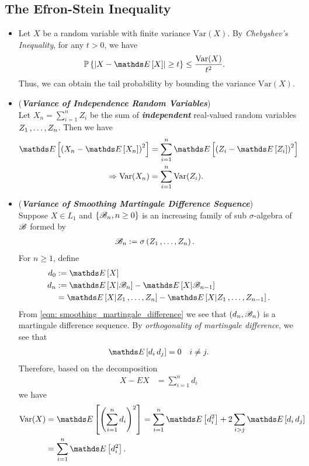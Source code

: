 \documentclass[11pt]{article}
\begin{document}
\subsection{The Efron-Stein Inequality}
\begin{itemize}
\item \begin{remark}
Let $X$ be a random variable with finite variance $\text{Var}(X)$.  By \emph{Chebyshev's Inequality},  for any $t > 0$, we have
\begin{align*}
\bP\set{\abs{X - \E{}{X}} \ge t} &\le \frac{\text{Var}(X)}{t^2}. 
\end{align*}
Thus, we can obtain the tail probability by bounding the variance $\text{Var}(X)$.
\end{remark}


\item \begin{remark} (\textbf{\emph{Variance of Independence Random Variables}})\\
Let $X_n =  \sum_{i=1}^{n}Z_i$ be the sum of \emph{\textbf{independent}} real-valued random variables $Z_1 \,{,}\ldots{,}\, Z_n$. Then we have 
\begin{align*}
\E{}{\paren{X_n - \E{}{X_n}}^2} &= \sum_{i=1}^{n}\E{}{\paren{Z_i - \E{}{Z_i}}^2}\\
\Rightarrow \text{Var}(X_n) &= \sum_{i=1}^{n}\text{Var}(Z_i).
\end{align*}
\end{remark}

\item \begin{remark} (\textbf{\emph{Variance of Smoothing Martingale Difference Sequence}})\\
Suppose $X \in L_1$ and $\left\{{\mathscr B}_n, n \ge 0\right\}$ is an increasing family of sub $\sigma$-algebra of ${\mathscr B}$ formed by 
\begin{align*}
{\mathscr B}_n &:= \sigma\left(Z_1 \,{,}\ldots{,}\, Z_n\right).
\end{align*} For $n \ge 1$, define 
\begin{align*}
d_0 &:= \E{}{X} \\ 
d_n &:= \E{}{X | \srB_n} - \E{}{X | \srB_{n-1}} \\
&= \E{}{X | Z_1 \xdotx{,} Z_n} -  \E{}{X | Z_1 \xdotx{,} Z_{n-1}}.
\end{align*} From \eqref{eqn: smoothing_martingale_difference} we see that $(d_n, {\mathscr B}_n)$ is a martingale difference sequence. By \emph{orthogonality of martingale difference}, we see that 
\begin{align*}
\E{}{d_i\, d_j} =0 \quad i\neq j.
\end{align*} Therefore, based on the decomposition
\begin{align*}
X - E{}{X} &= \sum_{i=1}^{n}d_i
\end{align*}
we have 
\begin{align}
\text{Var}(X) &= \E{}{\paren{\sum_{i=1}^{n}d_i}^2} = \sum_{i=1}^{n}\E{}{d_i^2} + 2 \sum_{i > j}\E{}{d_i\,d_j}\nonumber\\
&=  \sum_{i=1}^{n}\E{}{d_i^2}. \label{eqn: martingale_smoothing}
\end{align}
\end{remark}


\end{itemize}
\end{document}
